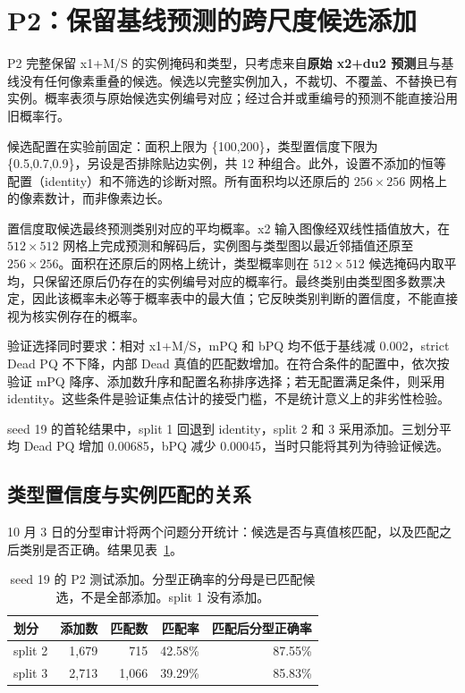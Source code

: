 \documentclass[11pt,a4paper,UTF8,fontset=fandol]{ctexart}
\begin{document}
\section{P2：保留基线预测的跨尺度候选添加}

P2 完整保留 x1+M/S 的实例掩码和类型，只考虑来自\textbf{原始 x2+du2 预测}且与基线没有任何像素重叠的候选。候选以完整实例加入，不裁切、不覆盖、不替换已有实例。概率表须与原始候选实例编号对应；经过合并或重编号的预测不能直接沿用旧概率行。

候选配置在实验前固定：面积上限为 \{100,200\}，类型置信度下限为 \{0.5,0.7,0.9\}，另设是否排除贴边实例，共 12 种组合。此外，设置不添加的恒等配置（identity）和不筛选的诊断对照。所有面积均以还原后的 $256\times256$ 网格上的像素数计，而非像素边长。

置信度取候选最终预测类别对应的平均概率。x2 输入图像经双线性插值放大，在 $512\times512$ 网格上完成预测和解码后，实例图与类型图以最近邻插值还原至 $256\times256$。面积在还原后的网格上统计，类型概率则在 $512\times512$ 候选掩码内取平均，只保留还原后仍存在的实例编号对应的概率行。最终类别由类型图多数票决定，因此该概率未必等于概率表中的最大值；它反映类别判断的置信度，不能直接视为核实例存在的概率。

验证选择同时要求：相对 x1+M/S，mPQ 和 bPQ 均不低于基线减 0.002，strict Dead PQ 不下降，内部 Dead 真值的匹配数增加。在符合条件的配置中，依次按验证 mPQ 降序、添加数升序和配置名称排序选择；若无配置满足条件，则采用 identity。这些条件是验证集点估计的接受门槛，不是统计意义上的非劣性检验。

seed 19 的首轮结果中，split 1 回退到 identity，split 2 和 3 采用添加。三划分平均 Dead PQ 增加 0.00685，bPQ 减少 0.00045，当时只能将其列为待验证候选。

\subsection{类型置信度与实例匹配的关系}

10 月 3 日的分型审计将两个问题分开统计：候选是否与真值核匹配，以及匹配之后类别是否正确。结果见表~\ref{tab:typing}。

\begin{table}[H]
\centering\small
\caption{seed 19 的 P2 测试添加。分型正确率的分母是已匹配候选，不是全部添加。split 1 没有添加。}
\label{tab:typing}
\begin{tabular}{lrrrr}\toprule
划分 & 添加数 & 匹配数 & 匹配率 & 匹配后分型正确率\\\midrule
split 2 & 1,679 & 715 & 42.58\% & 87.55\%\\
split 3 & 2,713 & 1,066 & 39.29\% & 85.83\%\\\bottomrule
\end{tabular}
\end{table}
\end{document}
